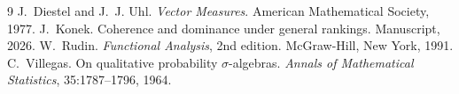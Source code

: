 \documentclass[11pt]{article}
\theoremstyle{definition}
\begin{document}
\begin{thebibliography}{9}
 J.~Diestel and J.~J. Uhl. \emph{Vector Measures}. American Mathematical Society, 1977.
 J.~Konek. Coherence and dominance under general rankings. Manuscript, 2026.
 W.~Rudin. \emph{Functional Analysis}, 2nd edition. McGraw-Hill, New York, 1991.
 {\color{red}C.~Villegas. On qualitative probability $\sigma$-algebras. \emph{Annals of Mathematical Statistics}, 35:1787--1796, 1964.}
\end{thebibliography}
\end{document}
